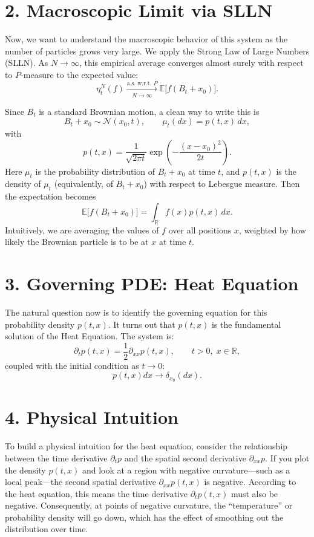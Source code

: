 \documentclass[11pt]{article}
\theoremstyle{definition}
\theoremstyle{remark}
\begin{document}
\section*{2. Macroscopic Limit via SLLN}
Now, we want to understand the macroscopic behavior of this system as the number of particles grows very large. We apply the Strong Law of Large Numbers (SLLN). As $N\to\infty$, this empirical average converges almost surely with respect to $P$-measure to the expected value:
\[
\eta_t^N(f)\xrightarrow[N\to\infty]{\text{a.s. w.r.t. }P}\mathbb{E}\bigl[f(B_t+x_0)\bigr].
\]

Since $B_t$ is a standard Brownian motion, a clean way to write this is
\[
B_t+x_0\sim \mathcal N(x_0,t),\qquad \mu_t(dx)=p(t,x)\,dx,
\]
with
\[
p(t,x)=\frac{1}{\sqrt{2\pi t}}\exp\!\left(-\frac{(x-x_0)^2}{2t}\right).
\]
Here $\mu_t$ is the probability distribution of $B_t+x_0$ at time $t$, and $p(t,x)$ is the density of $\mu_t$ (equivalently, of $B_t+x_0$) with respect to Lebesgue measure.
Then the expectation becomes
\[
\mathbb{E}\bigl[f(B_t+x_0)\bigr]=\int_{\mathbb{R}} f(x)p(t,x)\,dx.
\]
Intuitively, we are averaging the values of $f$ over all positions $x$, weighted by how likely the Brownian particle is to be at $x$ at time $t$.

\section*{3. Governing PDE: Heat Equation}
The natural question now is to identify the governing equation for this probability density $p(t,x)$. It turns out that $p(t,x)$ is the fundamental solution of the Heat Equation. The system is:
\[
\partial_t p(t,x)=\frac{1}{2}\partial_{xx}p(t,x),\qquad t>0,\;x\in\mathbb{R},
\]
coupled with the initial condition as $t\to0$:
\[
p(t,x)dx\to\delta_{x_0}(dx).
\]

\section*{4. Physical Intuition}
To build a physical intuition for the heat equation, consider the relationship between the time derivative $\partial_t p$ and the spatial second derivative $\partial_{xx}p$. If you plot the density $p(t,x)$ and look at a region with negative curvature---such as a local peak---the second spatial derivative $\partial_{xx}p(t,x)$ is negative. According to the heat equation, this means the time derivative $\partial_t p(t,x)$ must also be negative. Consequently, at points of negative curvature, the ``temperature'' or probability density will go down, which has the effect of smoothing out the distribution over time.
\end{document}
